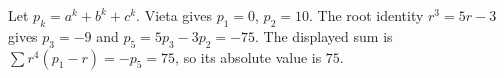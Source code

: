 Let $p_k=a^k+b^k+c^k$. Vieta gives $p_1=0$, $p_2=10$. The root identity $r^3=5r-3$ gives $p_3=-9$ and $p_5=5p_3-3p_2=-75$. The displayed sum is $\sum r^4(p_1-r)=-p_5=75$, so its absolute value is $\boxed{75}$.
